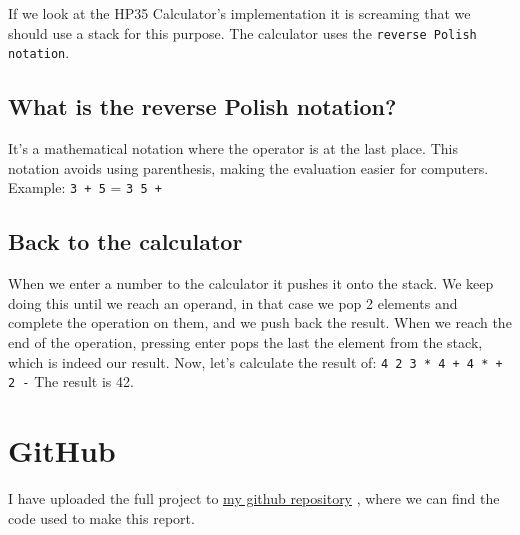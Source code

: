 \documentclass[a4paper,11pt]{article}
\newcommand{\underlinehref}[2]{%
    \href{#1}{\ul{#2}}%
}
\begin{document}
    If we look at the HP35 Calculator's implementation it is screaming that we should use a stack for this purpose.
    The calculator uses the {\tt reverse Polish notation}.

    \subsection*{What is the reverse Polish notation?}

    It's a mathematical notation where the operator is at the last place.
    This notation avoids using parenthesis, making the evaluation easier for computers.
    Example: {\tt 3 + 5} = {\tt 3 5 +}

    \subsection*{Back to the calculator}
    When we enter a number to the calculator it pushes it onto the stack.
    We keep doing this until we reach an operand, in that case we pop 2 elements and complete the operation on them, and we push back the result.
    When we reach the end of the operation, pressing enter pops the last the element from the stack, which is indeed our result.
    Now, let's calculate the result of:
        {\tt4 2 3 * 4 + 4 * + 2 -}
    The result is 42.

    \section*{GitHub}
    I have uploaded the full project to \underlinehref{https://github.com/peterherczku/ID1021/tree/main/assignment-2}{my github repository}, where we can find the code used to make this report.
\end{document}
